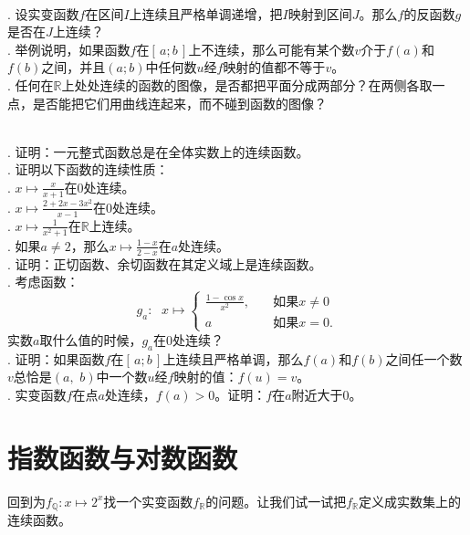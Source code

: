 \documentclass[12pt,UTF8,fontset=none]{ctexbook}
\begin{document}
\begin{sk}
    \mbox{} \\
    . 设实变函数$f$在区间$I$上连续且严格单调递增，把$I$映射到区间$J$。那么$f$的反函数$g$是否在$J$上连续？\\
    . 举例说明，如果函数$f$在$[\,a;b\,]$上不连续，那么可能有某个数$v$介于$f(a)$和$f(b)$之间，并且$(a;b)$中任何数$u$经$f$映射的值都不等于$v$。\\
    . 任何在$\mathbb{R}$上处处连续的函数的图像，是否都把平面分成两部分？在两侧各取一点，是否能把它们用曲线连起来，而不碰到函数的图像？
\end{sk}

\begin{xt}
    \mbox{} \\
    . 证明：一元整式函数总是在全体实数上的连续函数。\\
    . 证明以下函数的连续性质：\\
    . $x\mapsto \displaystyle\frac{x}{x + 1}$在$0$处连续。\\
    . $x\mapsto \displaystyle\frac{2 + 2x - 3x^2}{x - 1}$在$0$处连续。\\
    . $x\mapsto \displaystyle\frac{1}{x^2 + 1}$在$\mathbb{R}$上连续。\\
    . 如果$a\neq 2$，那么$x\mapsto \displaystyle\frac{1 - x}{2 - x}$在$a$处连续。\\
    . 证明：正切函数、余切函数在其定义域上是连续函数。\\
    . 考虑函数：
    $$
        g_a: \;\,\,x \mapsto \left\{ \begin{array}{cc}
            \displaystyle\frac{1 - \cos{x}}{x^2},&\quad \mbox{如果}x\neq 0 \\
            a &\quad \mbox{如果}x = 0. 
        \end{array}\right.
    $$
    实数$a$取什么值的时候，$g_a$在$0$处连续？\\
    . 证明：如果函数$f$在$[\,a;b\,]$上连续且严格单调，那么$f(a)$和$f(b)$之间任一个数$v$总恰是$(a, \,\,b)$中一个数$u$经$f$映射的值：$f(u) = v$。\\
    . 实变函数$f$在点$a$处连续，$f(a)>0$。证明：$f$在$a$附近大于$0$。
\end{xt}

\section{指数函数与对数函数}
回到为$f_{\mathbb{Q}}: x\mapsto 2^x$找一个实变函数$f_{\mathbb{R}}$的问题。让我们试一试把$f_{\mathbb{R}}$定义成实数集上的连续函数。
\end{document}
